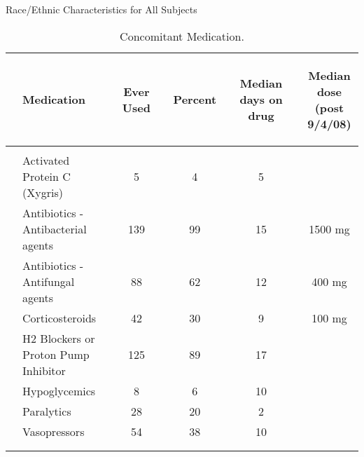 \documentclass[dvips, 10pt]{article}
\begin{document}
\begin{table}
\caption{Race/Ethnic Characteristics for All Subjects}
\end{table}
\clearpage
\begin{table}[t]
\caption
{ Concomitant Medication. }
\begin{center}
\begin{tabular}{ @{}l@{}
@{}l@{}@{}p{1.5em}@{}@{}c@{}@{}p{1.5em}@{}@{}c@{}@{}p{1.5em}@{}@{}c@{}@{}p{1.5em}@{}@{}c@{}
}
\hline

& \parbox{6em}{\begin{center}Medication\end{center}} && \parbox{6em}{\begin{center}Ever Used\end{center}} && \parbox{6em}{\begin{center}Percent\end{center}} && \parbox{6em}{\begin{center}Median days on drug\end{center}} && \parbox{6em}{\begin{center}Median dose (post 9/4/08)\end{center}} \\

\hline

\\
& Activated Protein C (Xygris) && 5 && 4 && 5 &&  \\
& Antibiotics - Antibacterial agents && 139 && 99 && 15 && 1500 mg \\
& Antibiotics - Antifungal agents && 88 && 62 && 12 && 400 mg \\
& Corticosteroids && 42 && 30 && 9 && 100 mg \\
& H2 Blockers or Proton Pump Inhibitor && 125 && 89 && 17 &&  \\
& Hypoglycemics && 8 && 6 && 10 &&  \\
& Paralytics && 28 && 20 && 2 &&  \\
& 
Vasopressors && 54 && 38 && 10 &&  \\
\\
\hline \\

\end{tabular}

\end{center}
 \end{table}
\end{document}
